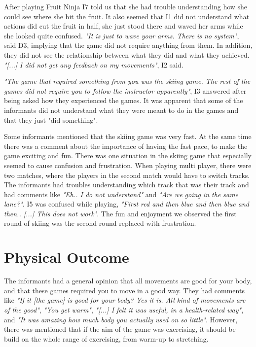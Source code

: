 After playing Fruit Ninja I7 told us that she had trouble understanding how she could see where she hit the fruit. It also seemed that I1 did not understand what actions did cut the fruit in half, she just stood there and waved her arms while she looked quite confused. \emph{"It is just to wave your arms. There is no system"}, said D3, implying that the game did not require anything from them. In addition, they did not see the relationship between what they did and what they achieved. \emph{"[...] I did not get any feedback on my movements"}, I2 said. 

\emph{"The game that required something from you was the skiing game. The rest of the games did not require you to follow the instructor apparently"}, I3 answered after being asked how they experienced the games. It was apparent that some of the informants did not understand what they were meant to do in the games and that they just "did something". 

Some informants mentioned that the skiing game was very fast. At the same time there was a comment about the importance of having the fast pace, to make the game exciting and fun. There was one situation in the skiing game that especially seemed to cause confusion and frustration. When playing multi player, there were two matches, where the players in the second match would have to switch tracks. The informants had troubles understanding which track that was their track and had comments like \emph{"Eh.. I do not understand"} and \emph{"Are we going in the same lane?"}. I5 was confused while playing, \emph{"First red and then blue and then blue and then.. [...] This does not work"}. The fun and enjoyment we observed the first round of skiing was the second round replaced with frustration. 

\section{Physical Outcome}

The informants had a general opinion that all movements are good for your body, and that these games required you to move in a good way. They had comments like \emph{"If it [the game] is good for your body? Yes it is. All kind of movements are of the good"}, \emph{"You get warm"}, \emph{"[...] I felt it was useful, in a health-related way"}, and \emph{"It was amazing how much body you actually used on so little"}. However, there was mentioned that if the aim of the game was exercising, it should be build on the whole range of exercising, from warm-up to stretching. 

